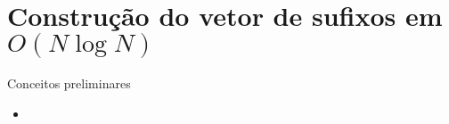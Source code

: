 \section{Construção do vetor de sufixos em $O(N\log N)$}

\begin{frame}[fragile]{Conceitos preliminares}

    \begin{itemize}
        \item
    \end{itemize}

\end{frame}

